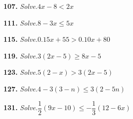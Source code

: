 \documentclass{ximera}
\begin{document}
\begin{problem}
\textbf{107.} \emph{Solve.}\quad $4x - 8 < 2x$

\begin{multipleChoice}
\end{multipleChoice}
\end{problem}

\begin{problem}
\textbf{111.} \emph{Solve.}\quad $8 - 3x \le 5x$

\begin{multipleChoice}
\end{multipleChoice}
\end{problem}

\begin{problem}
\textbf{115.} \emph{Solve.}\quad $0.15x + 55 > 0.10x + 80$

\begin{multipleChoice}
\end{multipleChoice}
\end{problem}

\begin{problem}
\textbf{119.} \emph{Solve.}\quad $3(2x - 5) \ge 8x - 5$

\begin{multipleChoice}
\end{multipleChoice}
\end{problem}

\begin{problem}
\textbf{123.} \emph{Solve.}\quad $5(2 - x) > 3(2x - 5)$

\begin{multipleChoice}
\end{multipleChoice}
\end{problem}

\begin{problem}
\textbf{127.} \emph{Solve.}\quad $4 - 3(3 - n) \le 3(2 - 5n)$

\begin{multipleChoice}
\end{multipleChoice}
\end{problem}

\begin{problem}
\textbf{131.} \emph{Solve.}\quad $\dfrac{1}{2}(9x - 10) \le -\dfrac{1}{3}(12 - 6x)$

\begin{multipleChoice}
\end{multipleChoice}
\end{problem}
\end{document}
